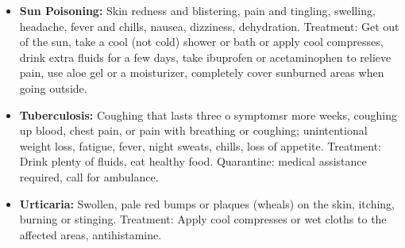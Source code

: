 \begin{itemize}
\item \textbf{Sun Poisoning:} Skin redness and blistering, pain and tingling, swelling, headache, fever and chills, nausea, dizziness, dehydration. Treatment: Get out of the sun, take a cool (not cold) shower or bath or apply cool compresses, drink extra fluids for a few days, take ibuprofen or acetaminophen to relieve pain, use aloe gel or a moisturizer, completely cover sunburned areas when going outside.

\item \textbf{Tuberculosis:} Coughing that lasts three o symptomsr more weeks, coughing up blood, chest pain, or pain with breathing or coughing; unintentional weight loss, fatigue, fever, night sweats, chills, loss of appetite. Treatment: Drink plenty of fluids, eat healthy food. Quarantine: medical assistance required, call for ambulance.

\item \textbf{Urticaria:} Swollen, pale red bumps or plaques (wheals) on the skin, itching, burning or stinging. Treatment: Apply cool compresses or wet cloths to the affected areas, antihistamine.

\end{itemize}
